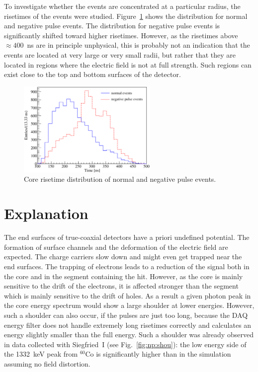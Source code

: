 To investigate whether the events are concentrated at a particular
radius, the risetimes of the events were studied.
Figure~\ref{fig:np:nert} shows the distribution for normal and
negative pulse events. The distribution for negative pulse events is
significantly shifted toward higher risetimes. However, as the
risetimes above $\approx 400$~ns are in principle unphysical, this is
probably not an indication that the events are located at very large
or very small radii, but rather that they are located in regions where
the electric field is not at full strength. Such regions can exist
close to the top and bottom surfaces of the detector.

\begin{figure}[tphb]
\centering
\includegraphics[width=0.6\textwidth]{RTall}
\caption{Core risetime distribution of normal and negative pulse events.}
\label{fig:np:nert}
\end{figure}

\section{Explanation}
\label{sec:np:exp}
The end surfaces of true-coaxial detectors have a priori undefined
potential. The formation of surface channels \cite{Sur05} and the
deformation of the electric field are expected. The charge carriers
slow down and might even get trapped near the end surfaces. The
trapping of electrons leads to a reduction of the signal both in the
core and in the segment containing the hit. However, as the core is
mainly sensitive to the drift of the electrons, it is affected
stronger than the segment which is mainly sensitive to the drift of
holes. As a result a given photon peak in the core energy spectrum
would show a large shoulder at lower energies. However, such a
shoulder can also occur, if the pulses are just too long, because the
DAQ energy filter does not handle extremely long risetimes correctly
and calculates an energy slightly smaller than the full energy. Such a
shoulder was already observed in data collected with Siegfried~I (see
Fig.~\ref{fig:np:shou}): the low energy side of the 1332~keV peak from
$^{60}$Co is significantly higher than in the simulation assuming no
field distortion.

